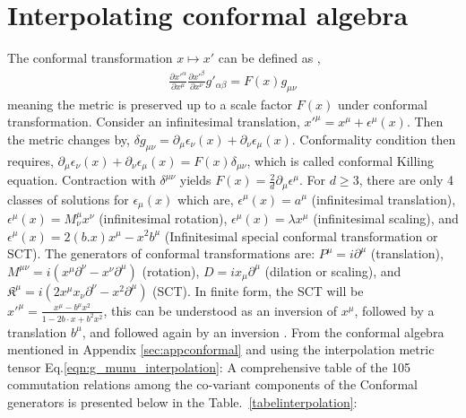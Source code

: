 \documentclass[aps,reprint,notitlepage,nofootinbib,superscriptaddress]{revtex4-1}
\begin{document}
\section{Interpolating conformal algebra}
\label{sec:conformal}
The conformal transformation $x\longmapsto x'$ can be defined as \cite{Francesco,Blumenhagen}, 
\begin{align}
    \frac{\partial x'^{\alpha}}{\partial x^{\mu}}\frac{\partial x'^{\beta}}{\partial x^{\nu}}g'_{\alpha\beta}=F(x)g_{\mu\nu}
\end{align}
meaning the metric is preserved up to a scale factor $F(x)$ under conformal transformation. 
Consider an infinitesimal translation, $x'^{\mu}=x^{\mu}+\epsilon^{\mu}(x)$. Then the metric changes by, $\delta g_{\mu\nu}=\partial_{\mu}\epsilon_{\nu}(x)+\partial_{\nu}\epsilon_{\mu}(x)$. Conformality condition then requires, $\partial_{\mu}\epsilon_{\nu}(x)+\partial_{\nu}\epsilon_{\mu}(x)=F(x)\delta_{\mu\nu}$, which is called conformal Killing equation. Contraction with $\delta^{\mu\nu}$ yields $F(x)=\frac{2}{d}\partial_{\mu}\epsilon^{\mu}$. For $d\geq3$, there are only 4 classes of solutions for $\epsilon_{\mu}(x)$ which are, $\epsilon^{\mu}(x)=a^{\mu}$ (infinitesimal translation), $\epsilon^{\mu}(x)=M^{\mu}_{\nu}x^{\nu}$ (infinitesimal rotation), $\epsilon^{\mu}(x)=\lambda x^{\mu}$ (infinitesimal scaling), and $\epsilon^{\mu}(x)=2(b.x) x^{\mu}-x^2b^{\mu}$ (Infinitesimal special conformal transformation or SCT). The generators of conformal transformations are: $P^{{\mu}}=i\partial^{{\mu}}$ (translation), $M^{{\mu}{\nu}}=i\left(x^{{\mu}}\partial^{{\nu}}-x^{{\nu}}\partial^{{\mu}}\right)$ (rotation), $D=ix_{{\mu}}\partial^{{\mu}}$ (dilation or scaling), and $\mathfrak{K}^{{\mu}}=i\left(2x^{{\mu}}x_{{\nu}}\partial^{{\nu}}-x^2\partial^{{\mu}}\right)$ (SCT). In finite form, the SCT will be $x'^{\mu }={\frac {x^{\mu }-b^{\mu }x^{2}}{1-2b\cdot x+b^{2}x^{2}}}$, this can be understood as an inversion of $x^\mu$, followed by a translation $b^\mu$, and followed again by an inversion \cite{Blumenhagen}. From the conformal algebra mentioned in Appendix \ref{sec:appconformal} and using the interpolation metric tensor Eq.\eqref{eqn:g_munu_interpolation}: A comprehensive table of the 105 commutation relations among the co-variant components of the Conformal generators is presented below in the Table.~\ref{tabelinterpolation}:
\end{document}

